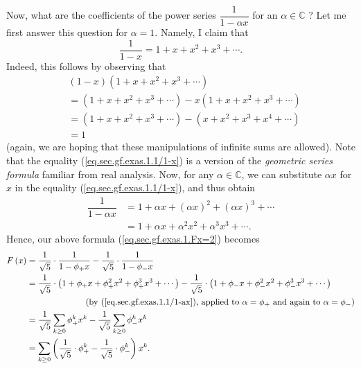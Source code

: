 Now, what are the coefficients of the power series $\dfrac{1}{1-\alpha x}$ for
an $\alpha\in\mathbb{C}$ ? Let me first answer this question for $\alpha=1$.
Namely, I claim that%
\begin{equation}
\dfrac{1}{1-x}=1+x+x^{2}+x^{3}+\cdots. \label{eq.sec.gf.exas.1.1/1-x}%
\end{equation}
Indeed, this follows by observing that
\begin{align*}
&  \left(  1-x\right)  \left(  1+x+x^{2}+x^{3}+\cdots\right) \\
&  =\left(  1+x+x^{2}+x^{3}+\cdots\right)  -x\left(  1+x+x^{2}+x^{3}%
+\cdots\right) \\
&  =\left(  1+x+x^{2}+x^{3}+\cdots\right)  -\left(  x+x^{2}+x^{3}+x^{4}%
+\cdots\right) \\
&  =1
\end{align*}
(again, we are hoping that these manipulations of infinite sums are allowed).
Note that the equality (\ref{eq.sec.gf.exas.1.1/1-x}) is a version of the
\emph{geometric series formula} familiar from real analysis. Now, for any
$\alpha\in\mathbb{C}$, we can substitute $\alpha x$ for $x$ in the equality
(\ref{eq.sec.gf.exas.1.1/1-x}), and thus obtain%
\begin{align}
\dfrac{1}{1-\alpha x}  &  =1+\alpha x+\left(  \alpha x\right)  ^{2}+\left(
\alpha x\right)  ^{3}+\cdots\nonumber\\
&  =1+\alpha x+\alpha^{2}x^{2}+\alpha^{3}x^{3}+\cdots.
\label{eq.sec.gf.exas.1.1/1-ax}%
\end{align}
Hence, our above formula (\ref{eq.sec.gf.exas.1.Fx=2}) becomes%
\begin{align*}
F\left(  x\right)   &  =\dfrac{1}{\sqrt{5}}\cdot\dfrac{1}{1-\phi_{+}x}%
-\dfrac{1}{\sqrt{5}}\cdot\dfrac{1}{1-\phi_{-}x}\\
&  =\dfrac{1}{\sqrt{5}}\cdot\left(  1+\phi_{+}x+\phi_{+}^{2}x^{2}+\phi_{+}%
^{3}x^{3}+\cdots\right)  -\dfrac{1}{\sqrt{5}}\cdot\left(  1+\phi_{-}x+\phi
_{-}^{2}x^{2}+\phi_{-}^{3}x^{3}+\cdots\right) \\
&  \ \ \ \ \ \ \ \ \ \ \ \ \ \ \ \ \ \ \ \ \left(  \text{by
(\ref{eq.sec.gf.exas.1.1/1-ax}), applied to }\alpha=\phi_{+}\text{ and again
to }\alpha=\phi_{-}\right) \\
&  =\dfrac{1}{\sqrt{5}}\sum_{k\geq0}\phi_{+}^{k}x^{k}-\dfrac{1}{\sqrt{5}}%
\sum_{k\geq0}\phi_{-}^{k}x^{k}\\
&  =\sum_{k\geq0}\left(  \dfrac{1}{\sqrt{5}}\cdot\phi_{+}^{k}-\dfrac{1}%
{\sqrt{5}}\cdot\phi_{-}^{k}\right)  x^{k}.
\end{align*}
